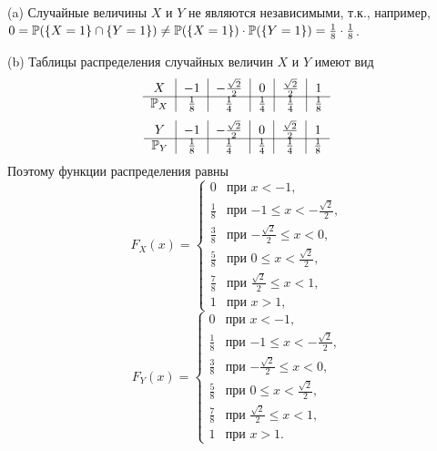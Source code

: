 \documentclass[12pt, a4paper]{article}\usepackage[]{graphicx}\usepackage[]{color}
\begin{document}
\begin{enumerate}
					(a) Случайные величины $X$ и $Y$ не являются независимыми, т.к., например, $0 = \P(\{X=1\} \cap \{Y=1\}) \not= \P(\{X=1\}) \cdot \P(\{Y=1\}) = \frac{1}{8} \cdot \frac{1}{8}$.

					(b) Таблицы распределения случайных величин $X$ и $Y$ имеют вид
					\[
					\begin{tabular}{c|c|c|c|c|c}
					$X$             & $-1$            & $-\frac{\sqrt{2}}{2}$     & $0$             & $\frac{\sqrt{2}}{2}$     & $1$    \\ \cline{1-6}
					$\P_X$  & $\frac{1}{8}$   & $\frac{1}{4}$             & $\frac{1}{4}$   & $\frac{1}{4}$            & $\frac{1}{8}$  \\
					\end{tabular}
					\]
					\[
					\begin{tabular}{c|c|c|c|c|c}
					$Y$             & $-1$            & $-\frac{\sqrt{2}}{2}$     & $0$             & $\frac{\sqrt{2}}{2}$     & $1$    \\ \cline{1-6}
					$\P_Y$  & $\frac{1}{8}$   & $\frac{1}{4}$             & $\frac{1}{4}$   & $\frac{1}{4}$            & $\frac{1}{8}$  \\
					\end{tabular}
					\]
					Поэтому функции распределения равны
					\[
					F_X(x) =
					\begin{cases}
					0                           &   \text{при $x < -1$,} \\
					\frac{1}{8}                 &   \text{при $-1 \leq x < -\frac{\sqrt{2}}{2}$,} \\
					\frac{3}{8}                 &   \text{при $-\frac{\sqrt{2}}{2} \leq x < 0$,} \\
					\frac{5}{8}                 &   \text{при $0 \leq x < \frac{\sqrt{2}}{2}$,} \\
					\frac{7}{8}                 &   \text{при $\frac{\sqrt{2}}{2} \leq x < 1$,} \\
					1                           &   \text{при $x > 1$,}
					\end{cases}
					\]
					\[
					F_Y(x) =
					\begin{cases}
					0                           &   \text{при $x < -1$,} \\
					\frac{1}{8}                 &   \text{при $-1 \leq x < -\frac{\sqrt{2}}{2}$,} \\
					\frac{3}{8}                 &   \text{при $-\frac{\sqrt{2}}{2} \leq x < 0$,} \\
					\frac{5}{8}                 &   \text{при $0 \leq x < \frac{\sqrt{2}}{2}$,} \\
					\frac{7}{8}                 &   \text{при $\frac{\sqrt{2}}{2} \leq x < 1$,} \\
					1                           &   \text{при $x > 1$.}
					\end{cases}
					\]


\end{enumerate}
\end{document}
